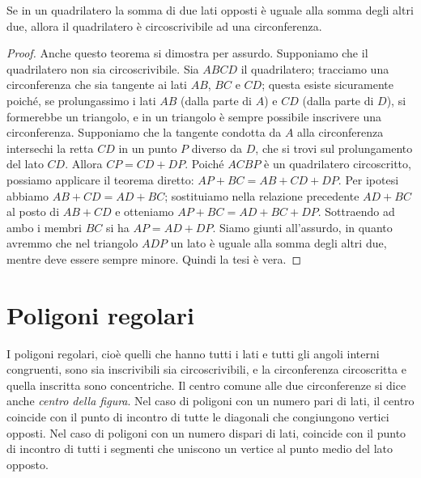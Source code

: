 \begin{teorema}
Se in un quadrilatero la somma di due lati opposti è uguale alla 
somma degli altri due, allora il quadrilatero è circoscrivibile ad 
una circonferenza.
\end{teorema}


\begin{inaccessibleblock}
 \begin{figure}[htb]
	\centering
\end{figure}
\end{inaccessibleblock}

\begin{proof}
Anche questo teorema si dimostra per assurdo.
Supponiamo che il quadrilatero non sia circoscrivibile.
Sia \(ABCD\) il quadrilatero; tracciamo una circonferenza che sia 
tangente ai lati \(AB\), \(BC\) e \(CD\); questa esiste sicuramente poiché, 
se prolungassimo i lati \(AB\) (dalla parte di \(A\)) e \(CD\) (dalla parte 
di \(D\)), si formerebbe un triangolo, e in un triangolo è sempre 
possibile inscrivere una circonferenza. Supponiamo che la tangente 
condotta da \(A\) alla circonferenza intersechi la retta \(CD\) in un 
punto \(P\) diverso da \(D\), che si trovi sul prolungamento del lato 
\(CD\). Allora \(CP=CD+DP\). Poiché \(ACBP\) è un quadrilatero 
circoscritto, possiamo applicare il teorema diretto: \(AP+BC=AB+CD+DP\).
Per ipotesi abbiamo \(AB+CD=AD+BC\); sostituiamo nella relazione 
precedente \(AD+BC\) al posto di \(AB+CD\) e otteniamo \(AP+BC=AD+BC+DP\).
Sottraendo ad ambo i membri \(BC\) si ha \(AP=AD+DP\).
Siamo giunti all'assurdo, in quanto avremmo che nel triangolo \(ADP\) 
un lato è uguale alla somma degli altri due, mentre deve essere 
sempre minore. Quindi la tesi è vera.
\end{proof}


\section{Poligoni regolari}\label{sect:poligoni_regolari}

I poligoni regolari, cioè quelli che hanno tutti i lati e tutti gli 
angoli interni congruenti, sono sia inscrivibili sia circoscrivibili, 
e la circonferenza circoscritta e quella inscritta sono concentriche.
Il centro comune alle due circonferenze si dice anche \emph{centro 
della figura}.
Nel caso di poligoni con un numero pari di lati, il centro coincide 
con il punto di incontro di tutte le diagonali che congiungono 
vertici opposti. 
Nel caso di poligoni con un numero dispari di lati, coincide con il 
punto di incontro di tutti i segmenti che uniscono un vertice al 
punto medio del lato opposto.


